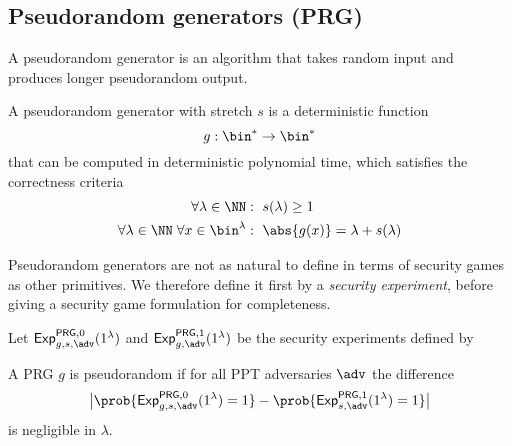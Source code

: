 \newpage
\subsection{Pseudorandom generators (PRG)}
A pseudorandom generator is an algorithm that takes random input and produces longer pseudorandom output.

\begin{syntax}
  A pseudorandom generator with stretch $s$ is a deterministic function
  \[g:\bin^*\rightarrow\bin^*\]
  that can be computed in deterministic polynomial time, which satisfies the correctness criteria
  \begin{align*}
    \forall \lambda\in\NN                            & :\ s(\lambda)\geq 1              \\
    \forall \lambda\in\NN\; \forall x\in\bin^\lambda & :\ \abs{g(x)}=\lambda+s(\lambda) \\
  \end{align*}
\end{syntax}

Pseudorandom generators are not as natural to define in terms of security games as other primitives. We therefore define it first by a \emph{security experiment}, before giving a security game formulation for completeness.

\begin{security}[Pseudorandomness]
  \vspace{5mm}
  Let ${\mathsf{Exp}}_{g,s,\adv}^{\mathsf{PRG},0}(1^\lambda)$ and ${\mathsf{Exp}}_{g,\adv}^{\mathsf{PRG},1}(1^\lambda)$ be the security experiments defined by
  \begin{center}
    \begin{pchstack}
      \pchspace
    \end{pchstack}
  \end{center}
  A PRG $g$ is pseudorandom if for all PPT adversaries $\adv$ the difference
  \[ \big|\prob{{\mathsf{Exp}}_{g,s,\adv}^{\mathsf{PRG},0}(1^\lambda) = 1}
    - \prob{{\mathsf{Exp}}_{s,\adv}^{\mathsf{PRG},1}(1^\lambda) = 1}\big| \]
  is negligible in $\lambda$.
\end{security}


